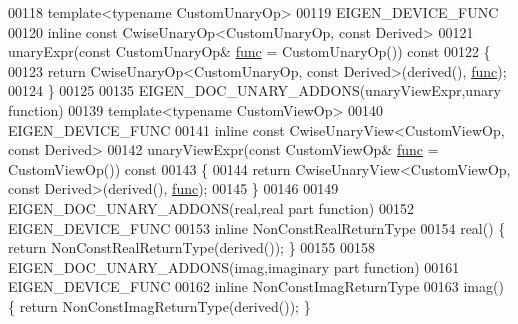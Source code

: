 \begin{DoxyCode}
00118 \textcolor{keyword}{template}<\textcolor{keyword}{typename} CustomUnaryOp>
00119 EIGEN\_DEVICE\_FUNC
00120 \textcolor{keyword}{inline} \textcolor{keyword}{const} CwiseUnaryOp<CustomUnaryOp, const Derived>
00121 unaryExpr(\textcolor{keyword}{const} CustomUnaryOp& \hyperlink{structfunc}{func} = CustomUnaryOp())\textcolor{keyword}{ const}
00122 \textcolor{keyword}{}\{
00123   \textcolor{keywordflow}{return} CwiseUnaryOp<CustomUnaryOp, const Derived>(derived(), \hyperlink{structfunc}{func});
00124 \}
00125 
00135 EIGEN\_DOC\_UNARY\_ADDONS(unaryViewExpr,unary \textcolor{keyword}{function})
00139 \textcolor{keyword}{template}<\textcolor{keyword}{typename} CustomViewOp>
00140 EIGEN\_DEVICE\_FUNC
00141 \textcolor{keyword}{inline} \textcolor{keyword}{const} CwiseUnaryView<CustomViewOp, const Derived>
00142 unaryViewExpr(\textcolor{keyword}{const} CustomViewOp& \hyperlink{structfunc}{func} = CustomViewOp())\textcolor{keyword}{ const}
00143 \textcolor{keyword}{}\{
00144   \textcolor{keywordflow}{return} CwiseUnaryView<CustomViewOp, const Derived>(derived(), \hyperlink{structfunc}{func});
00145 \}
00146 
00149 EIGEN\_DOC\_UNARY\_ADDONS(real,real part \textcolor{keyword}{function})
00152 EIGEN\_DEVICE\_FUNC
00153 \textcolor{keyword}{inline} NonConstRealReturnType
00154 real() \{ \textcolor{keywordflow}{return} NonConstRealReturnType(derived()); \}
00155 
00158 EIGEN\_DOC\_UNARY\_ADDONS(imag,imaginary part \textcolor{keyword}{function})
00161 EIGEN\_DEVICE\_FUNC
00162 \textcolor{keyword}{inline} NonConstImagReturnType
00163 imag() \{ \textcolor{keywordflow}{return} NonConstImagReturnType(derived()); \}
\end{DoxyCode}
